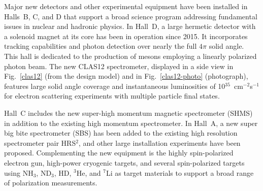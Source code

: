 \documentclass[final,3p]{elsarticle}
\begin{document}
\begin{twocolumn}
Major new detectors and other experimental equipment have been installed in Halls~B, C, and D that support a broad
science program addressing fundamental issues in nuclear and hadronic physics. In Hall~D, a large hermetic detector
with a solenoid magnet at its core has been in operation since 2015. It incorporates tracking capabilities and photon
detection over nearly the full $4\pi$ solid angle. This hall is dedicated to the production of mesons employing a linearly
polarized photon beam. The new CLAS12 spectrometer, displayed in a side view in Fig.~\ref{clas12} (from the design
model) and in Fig.~\ref{clas12-photo} (photograph), features large solid angle coverage and instantaneous luminosities
of 10$^{35}$~cm$^{-2}$s$^{-1}$ for electron scattering experiments with multiple particle final states. 

Hall~C includes the new super-high momentum magnetic spectrometer (SHMS) in addition to the existing high
momentum spectrometer. In Hall~A, a new super big bite spectrometer (SBS) has been added to the
existing high resolution spectrometer pair HRS$^2$, and other large installation experiments have been proposed.
Complementing the new equipment is the highly spin-polarized electron gun, high-power cryogenic targets, and
several spin-polarized targets using NH$_3$, ND$_3$, HD, $^3$He, and $^7$Li as target materials to support a
broad range of polarization measurements.   


\end{twocolumn}
\end{document}
